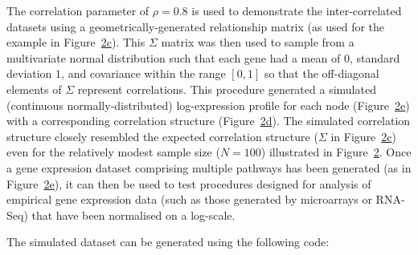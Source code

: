 \documentclass[]{article}
\begin{document}
The correlation parameter of \(\rho = 0.8\) is used to demonstrate the
inter-correlated datasets using a geometrically-generated relationship
matrix (as used for the example in
Figure~\protect\hyperlink{fig:simulation_activating:third}{2c}). This
\(\Sigma\) matrix was then used to sample from a multivariate normal
distribution such that each gene had a mean of \(0\), standard deviation
\(1\), and covariance within the range \([0,1]\) so that the
off-diagonal elements of \(\Sigma\) represent correlations. This
procedure generated a simulated (continuous normally-distributed)
log-expression profile for each node
(Figure~\protect\hyperlink{fig:simulation_activating:fourth}{2e}) with a
corresponding correlation structure
(Figure~\protect\hyperlink{fig:simulation_activating:fifth}{2d}). The
simulated correlation structure closely resembled the expected
correlation structure (\(\Sigma\) in
Figure~\protect\hyperlink{fig:simulation_activating:third}{2c}) even for
the relatively modest sample size (\(N=100\)) illustrated in
Figure~\protect\hyperlink{fig:simulation_activating}{2}. Once a gene
expression dataset comprising multiple pathways has been generated (as
in Figure~\protect\hyperlink{fig:simulation_activating:fourth}{2e}), it
can then be used to test procedures designed for analysis of empirical
gene expression data (such as those generated by microarrays or RNA-Seq)
that have been normalised on a log-scale.

The simulated dataset can be generated using the following code:
\end{document}
